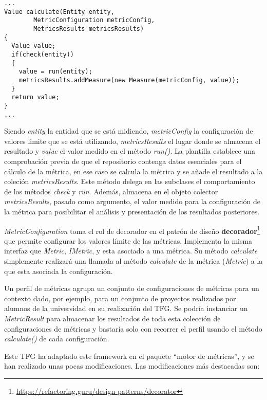 \begin{minipage}{\linewidth}
{\tiny
\begin{lstlisting}[breaklines]
...
Value calculate(Entity entity, 
		MetricConfiguration metricConfig, 
		MetricsResults metricsResults) 
{
  Value value;
  if(check(entity))
  {
    value = run(entity);
    metricsResults.addMeasure(new Measure(metricConfig, value));
  }
  return value;
}
...
\end{lstlisting}
}
\end{minipage}

Siendo \textit{entity} la entidad que se está midiendo, \textit{metricConfig} la configuración de valores limite que se está utilizando, \textit{metricsResults} el lugar donde se almacena el resultado y \textit{value} el valor medido en el método \textit{run()}. La plantilla establece una comprobación previa de que el repositorio contenga datos esenciales para el cálculo de la métrica, en ese caso se calcula la métrica y se añade el resultado a la coleción \textit{metricsResults}. 
Este método delega en las subclases el comportamiento de los métodos \textit{check} y \textit{run}. Además, almacena en el objeto colector \textit{metricsResults}, pasado como argumento, el valor medido para la configuración de la métrica para posibilitar el análisis y presentación de los resultados posteriores.

\textit{MetricConfiguration} toma el rol de decorador en el patrón de diseño \textbf{decorador}\footnote{\url{https://refactoring.guru/design-patterns/decorator}} que permite configurar los valores límite de las métricas. Implementa la misma interfaz que \textit{Metric}, \textit{IMetric}, y esta asociado a una métrica. Su método \textit{calculate} simplemente realizará una llamada al método \textit{calculate} de la métrica (\textit{Metric}) a la que esta asociada la configuración.

Un perfil de métricas agrupa un conjunto de configuraciones de métricas para un contexto dado, por ejemplo, para un conjunto de proyectos realizados por alumnos de la universidad en su realización del TFG. Se podría instanciar un \textit{MetricResult} para almacenar los resultados de toda esta colección de configuraciones de métricas y bastaría solo con recorrer el perfil usando el método \textit{calculate()} de cada configuración.

Este TFG ha adaptado este framework en el paquete ``motor de métricas'', y se han realizado unas pocas modificaciones. Las modificaciones más destacadas son:


